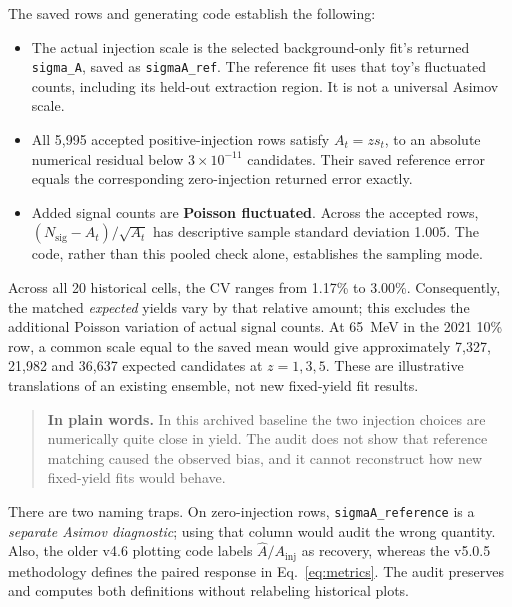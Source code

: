 \documentclass[11pt]{article}
\newcommand{\Ah}{\widehat A}
\newcommand{\plain}[1]{\begin{quote}\textbf{In plain words.} #1\end{quote}}
\begin{document}
The saved rows and generating code establish the following:
\begin{itemize}
 \item The actual injection scale is the selected background-only fit's
 returned \texttt{sigma\_A}, saved as \texttt{sigmaA\_ref}. The reference
 fit uses that toy's fluctuated counts, including its held-out extraction
 region. It is not a universal Asimov scale.
 \item All 5,995 accepted positive-injection rows satisfy
 $A_t=z s_t$, to an absolute numerical residual below
 $3\times10^{-11}$ candidates. Their saved reference error equals the
 corresponding zero-injection returned error exactly.
 \item Added signal counts are \textbf{Poisson fluctuated}. Across the
 accepted rows, $(N_{\mathrm{sig}}-A_t)/\sqrt{A_t}$ has descriptive sample
 standard deviation 1.005. The code, rather than this pooled check alone,
 establishes the sampling mode.
\end{itemize}

\begin{table}[H]\centering\small

\caption{Historical 2021 10\% baseline, 100 reference toys per mass. Errors
and their standard deviations are in signal candidates. CV is
$\operatorname{SD}(s_t)/\overline s$. The last column is the descriptive
sample correlation with the signed zero-injection yield. It is not a
significance test.}
\label{tab:archive}
\end{table}

Across all 20 historical cells, the CV ranges from 1.17\% to 3.00\%.
Consequently, the matched \emph{expected} yields vary by that relative
amount; this excludes the additional Poisson variation of actual signal
counts. At 65~MeV in the 2021 10\% row, a common scale equal to the saved
mean would give approximately 7,327, 21,982 and 36,637 expected candidates
at $z=1,3,5$. These are illustrative translations of an existing ensemble,
not new fixed-yield fit results.

\plain{In this archived baseline the two injection choices are numerically
quite close in yield. The audit does not show that reference matching caused
the observed bias, and it cannot reconstruct how new fixed-yield fits would
behave.}

There are two naming traps. On zero-injection rows,
\texttt{sigmaA\_reference} is a \emph{separate Asimov diagnostic}; using that
column would audit the wrong quantity. Also, the older v4.6 plotting code
labels $\Ah/A_{\mathrm{inj}}$ as recovery, whereas the v5.0.5 methodology
defines the paired response in Eq.~\eqref{eq:metrics}. The audit preserves
and computes both definitions without relabeling historical plots.
\end{document}
